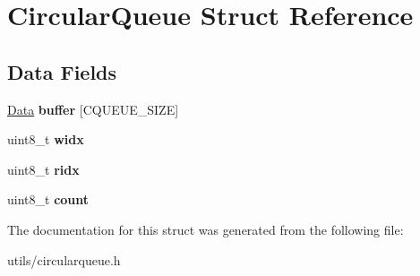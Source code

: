 \hypertarget{struct_circular_queue}{}\section{Circular\+Queue Struct Reference}
\label{struct_circular_queue}
\subsection*{Data Fields}
\begin{DoxyCompactItemize}
\item 
\mbox{\label{struct_circular_queue_a117c80527812be99abc9dfb1cb380d76}} 
\mbox{\hyperlink{struct_data}{Data}} {\bfseries buffer} \mbox{[}C\+Q\+U\+E\+U\+E\+\_\+\+S\+I\+ZE\mbox{]}
\item 
\mbox{\label{struct_circular_queue_a6077ad7c7dd4ccb626202b7e3c7673a8}} 
uint8\+\_\+t {\bfseries widx}
\item 
\mbox{\label{struct_circular_queue_a2ed9d40357764d744ebf415c1bb447f1}} 
uint8\+\_\+t {\bfseries ridx}
\item 
\mbox{\label{struct_circular_queue_a20302e2c99a60d3f612dba57e3f6333b}} 
uint8\+\_\+t {\bfseries count}
\end{DoxyCompactItemize}


The documentation for this struct was generated from the following file\+:\begin{DoxyCompactItemize}
\item 
utils/circularqueue.\+h\end{DoxyCompactItemize}
